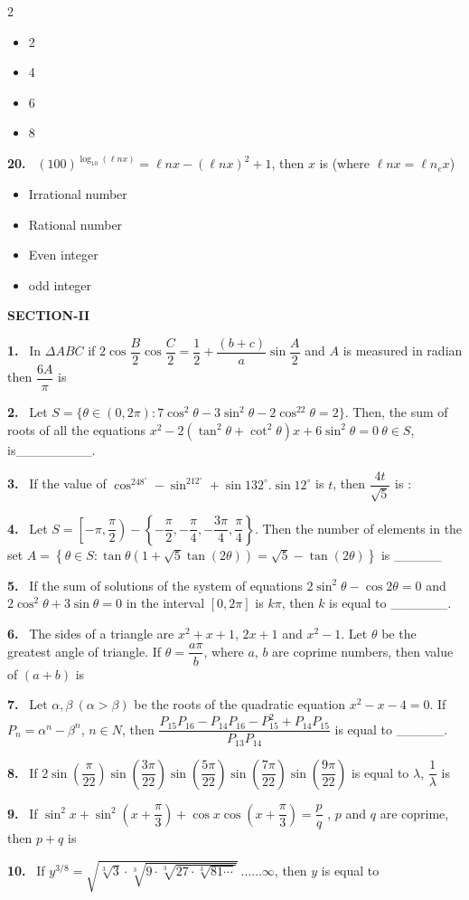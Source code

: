 \documentclass[10pt]{extarticle}
\newcommand{\sect}[1]{\par\smallskip\noindent\textbf{#1}\par}
\newcommand{\qn}[1]{\par\smallskip\noindent\textbf{#1.}~}
\newenvironment{qoptions}{\begin{itemize}[leftmargin=1.8em,itemsep=1pt,topsep=2pt,label={}]}{\end{itemize}}
\newcommand{\opt}[2]{\item[(#1)] #2}
\begin{document}
\begin{multicols}{2}
\begin{qoptions}
\opt{A}{2}
\opt{B}{4}
\opt{C}{6}
\opt{D}{8}
\end{qoptions}
\qn{20} $(100)^{\log_{10}(\ell nx)}=\ell nx-(\ell nx)^2+1$, then $x$ is (where $\ell nx=\ell n_ex$)
\begin{qoptions}
\opt{A}{Irrational number}
\opt{B}{Rational number}
\opt{C}{Even integer}
\opt{D}{odd integer}
\end{qoptions}
\sect{SECTION-II}
\qn{1} In $\Delta ABC$ if $2\cos\dfrac B2\cos\dfrac C2=\dfrac12+\dfrac{(b+c)}a\sin\dfrac A2$ and $A$ is measured in radian then $\dfrac{6A}\pi$ is
\qn{2} Let $S=\{\theta\in(0,2\pi):7\cos^2\theta-3\sin^2\theta-2\cos^22\theta=2\}$. Then, the sum of roots of all the equations $x^2-2\left(\tan^2\theta+\cot^2\theta\right)x+6\sin^2\theta=0\ \theta\in S$, is\_\_\_\_\_\_\_\_.
\qn{3} If the value of $\cos^248^\circ-\sin^212^\circ+\sin132^\circ.\sin12^\circ$ is $t$, then $\dfrac{4t}{\sqrt5}$ is :
\qn{4} Let $S=\left[-\pi,\dfrac\pi2\right)-\left\{-\dfrac\pi2,-\dfrac\pi4,-\dfrac{3\pi}4,\dfrac\pi4\right\}$. Then the number of elements in the set $A=\left\{\theta\in S:\tan\theta\left(1+\sqrt5\tan(2\theta)\right)=\sqrt5-\tan(2\theta)\right\}$ is \_\_\_\_\_
\qn{5} If the sum of solutions of the system of equations $2\sin^2\theta-\cos2\theta=0$ and $2\cos^2\theta+3\sin\theta=0$ in the interval $[0,2\pi]$ is $k\pi$, then $k$ is equal to \_\_\_\_\_\_.
\qn{6} The sides of a triangle are $x^2+x+1$, $2x+1$ and $x^2-1$. Let $\theta$ be the greatest angle of triangle. If $\theta=\dfrac{a\pi}b$, where $a$, $b$ are coprime numbers, then value of $(a+b)$ is
\qn{7} Let $\alpha,\beta\ (\alpha>\beta)$ be the roots of the quadratic equation $x^2-x-4=0$. If $P_n=\alpha^n-\beta^n$, $n\in N$, then $\dfrac{P_{15}P_{16}-P_{14}P_{16}-P_{15}^2+P_{14}P_{15}}{P_{13}P_{14}}$ is equal to \_\_\_\_\_.
\qn{8} If $2\sin\left(\dfrac\pi{22}\right)\sin\left(\dfrac{3\pi}{22}\right)\sin\left(\dfrac{5\pi}{22}\right)\sin\left(\dfrac{7\pi}{22}\right)\sin\left(\dfrac{9\pi}{22}\right)$ is equal to $\lambda$, $\dfrac1\lambda$ is
\qn{9} If $\sin^2x+\sin^2\left(x+\dfrac\pi3\right)+\cos x\cos\left(x+\dfrac\pi3\right)=\dfrac pq$ , $p$ and $q$ are coprime, then $p+q$ is
\qn{10} If $y^{3/8}=\sqrt{\sqrt[3]{3}\cdot\sqrt[3]{9\cdot\sqrt[3]{27\cdot\sqrt[3]{81\cdots}}}}\ \dots\dots\infty$, then $y$ is equal to
\end{multicols}
\end{document}
